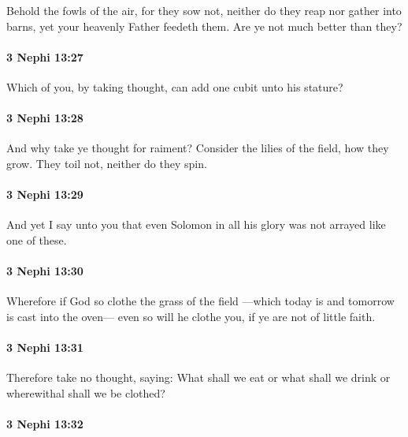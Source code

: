 			Behold the fowls of the air, for they sow not,
			neither do they reap nor gather into barns,
			yet your heavenly Father feedeth them.
			Are ye not much better than they?

		\paragraph{3 Nephi 13:27} %
			\label{3NEPHI-13-27}

			Which of you, by taking thought, can add one cubit unto his stature?

		\paragraph{3 Nephi 13:28} %
			\label{3NEPHI-13-28}

			And why take ye thought for raiment?
			Consider the lilies of the field, how they grow.
			They toil not, neither do they spin.

		\paragraph{3 Nephi 13:29} %
			\label{3NEPHI-13-29}

			And yet I say unto you
			that even Solomon in all his glory was not arrayed like one of these.

		\paragraph{3 Nephi 13:30} %
			\label{3NEPHI-13-30}

			Wherefore if God so clothe the grass of the field
			---which today is and tomorrow is cast into the oven---
			even so will he clothe you, if ye are not of little faith.

		\paragraph{3 Nephi 13:31} %
			\label{3NEPHI-13-31}

			Therefore take no thought, saying:
			What shall we eat or what shall we drink
			or wherewithal shall we be clothed?

		\paragraph{3 Nephi 13:32} %
			\label{3NEPHI-13-32}

